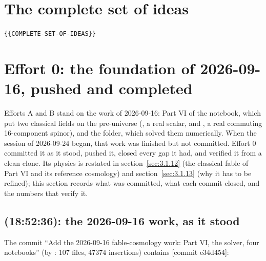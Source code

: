\section{The complete set of ideas}
\label{sec:1}

\texttt{\{\{COMPLETE-SET-OF-IDEAS\}\}}

\section{Effort 0: the foundation of 2026-09-16, pushed and completed}
\label{sec:2}

Efforts A and B stand on the work of 2026-09-16: Part VI of the notebook, which put two classical fields on the pre-universe (, a real scalar, and , a real commuting 16-component spinor), and the  folder, which solved them numerically. When the session of 2026-09-24 began, that work was finished but not committed. Effort 0 committed it as it stood, pushed it, closed every gap it had, and verified it from a clean clone. Its physics is restated in section~\ref{sec:3.1.12} (the classical fable of Part VI and its reference cosmology) and section~\ref{sec:3.1.13} (why it has to be refined); this section records what was committed, what each commit closed, and the numbers that verify it.

\subsection{\texorpdfstring{}{e34d454} (18:52:36): the 2026-09-16 work, as it stood}
\label{sec:2.1}

The commit ``Add the 2026-09-16 fable-cosmology work: Part VI, the solver, four notebooks'' (by : 107 files, 47374 insertions) contains [commit e34d454]:


